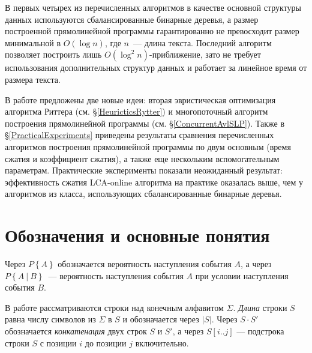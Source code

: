 \documentclass[14pt]{article}
\begin{document}
В первых четырех из перечисленных алгоритмов в качестве основной структуры данных используются сбалансированные бинарные деревья,
а размер построенной прямолинейной программы гарантированно не превосходит размер минимальной в $O(\log n)$, где $n$~--- длина текста.
Последний алгоритм позволяет построить лишь $O(\log^2 n)$-приближение, зато не требует использования дополнительных структур
данных и работает за линейное время от размера текста.

В работе предложены две новые идеи: вторая эвристическая оптимизация алгоритма Риттера (см. \S\ref{HeuricticsRytter})
и многопоточный алгоритм построения прямолинейной программы (см. \S\ref{ConcurrentAvlSLP}).
Также в \S\ref{PracticalExperiments} приведены результаты сравнения перечисленных алгоритмов построения прямолинейной программы по
двум основным (время сжатия и коэффициент сжатия), а также еще нескольким вспомогательным параметрам. Практические
эксперименты показали неожиданный результат: эффективность сжатия LCA-online алгоритма на практике оказалась выше,
чем у алгоритмов из класса, использующих сбалансированные бинарные деревья.



\section{Обозначения и основные понятия}

Через $P\left\{A\right\}$ обозначается вероятность наступления события $A$,
а через $P\left\{A~|~B\right\}$~--- вероятность наступления события $A$ при условии наступления события $B$.

В работе рассматриваются строки над конечным алфавитом $\Sigma$. \emph{Длина} строки $S$ равна числу символов из $\Sigma$ в $S$ и
обозначается через $|S|$. Через $S\cdot S'$ обозначается \emph{конкатенация} двух строк $S$ и $S'$, а через $S[i..j]$ --- подстрока
строки $S$ с позиции $i$ до позиции $j$ включительно.
\end{document}
